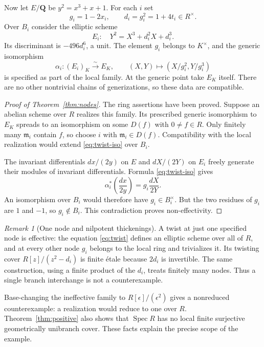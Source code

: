 \documentclass[11pt]{article}
\theoremstyle{definition}\newtheorem{definition}[theorem]{Definition}
\theoremstyle{remark}\newtheorem{remark}[theorem]{Remark}
\newcommand{\Spec}{\operatorname{Spec}}
\begin{document}
Now let $E/\mathbf Q$ be $y^2=x^3+x+1$. For each $i$ set
\[
 g_i=1-2x_i,\qquad d_i=g_i^2=1+4t_i\in R^\times.
\]
Over $B_i$ consider the elliptic scheme
\begin{equation}\label{eq:twist}
 E_i:\quad Y^2=X^3+d_i^2X+d_i^3.
\end{equation}
Its discriminant is $-496d_i^6$, a unit. The element $g_i$ belongs to $K^\times$, and the generic isomorphism
\begin{equation}\label{eq:twist-iso}
 \alpha_i:(E_i)_K\xrightarrow{\sim}E_K,
 \qquad (X,Y)\longmapsto(X/g_i^2,Y/g_i^3)
\end{equation}
is specified as part of the local family. At the generic point take $E_K$ itself. There are no other nontrivial chains of generizations, so these data are compatible.

\begin{proof}[Proof of Theorem~\ref{thm:nodes}]
The ring assertions have been proved. Suppose an abelian scheme over $R$ realizes this family. Its prescribed generic isomorphism to $E_K$ spreads to an isomorphism on some $D(f)$ with $0\ne f\in R$. Only finitely many $\mathfrak m_i$ contain $f$, so choose $i$ with $\mathfrak m_i\in D(f)$. Compatibility with the local realization would extend \eqref{eq:twist-iso} over $B_i$.

The invariant differentials $dx/(2y)$ on $E$ and $dX/(2Y)$ on $E_i$ freely generate their modules of invariant differentials. Formula \eqref{eq:twist-iso} gives
\[
 \alpha_i^*\left(\frac{dx}{2y}\right)
       =g_i\frac{dX}{2Y}.
\]
An isomorphism over $B_i$ would therefore have $g_i\in B_i^\times$. But the two residues of $g_i$ are $1$ and $-1$, so $g_i\notin B_i$. This contradiction proves non-effectivity.
\end{proof}

\begin{remark}[One node and nilpotent thickenings]\label{rem:finite-nodes}
A twist at just one specified node is effective: the equation \eqref{eq:twist} defines an elliptic scheme over all of $R$, and at every other node $g_i$ belongs to the local ring and trivializes it. Its twisting cover $R[z]/(z^2-d_i)$ is finite \'etale because $2d_i$ is invertible. The same construction, using a finite product of the $d_i$, treats finitely many nodes. Thus a single branch interchange is not a counterexample.

Base-changing the ineffective family to $R[\epsilon]/(\epsilon^2)$ gives a nonreduced counterexample: a realization would reduce to one over $R$. Theorem~\ref{thm:positive} also shows that $\Spec R$ has no local finite surjective geometrically unibranch cover. These facts explain the precise scope of the example.
\end{remark}
\end{document}
